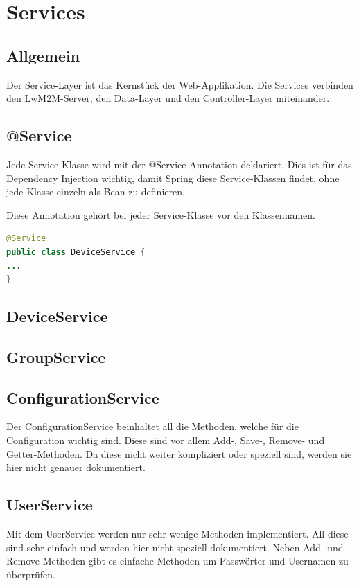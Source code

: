 \newpage

\section{Services}
\subsection{Allgemein}
Der Service-Layer ist das Kernstück der Web-Applikation. Die Services verbinden den LwM2M-Server, den Data-Layer und den Controller-Layer miteinander. 
\subsection{@Service}
Jede Service-Klasse wird mit der @Service Annotation deklariert. Dies ist für das Dependency Injection wichtig, damit Spring diese Service-Klassen findet, ohne jede Klasse einzeln als Bean zu definieren.

Diese Annotation gehört bei jeder Service-Klasse vor den Klassennamen.
\begin{lstlisting}[language=java]
@Service
public class DeviceService {
...
}
\end{lstlisting}

\subsection{DeviceService}

\subsection{GroupService}

\subsection{ConfigurationService}
Der ConfigurationService beinhaltet all die Methoden, welche für die Configuration wichtig sind. Diese sind vor allem Add-, Save-, Remove- und Getter-Methoden. Da diese nicht weiter kompliziert oder speziell sind, werden sie hier nicht genauer dokumentiert.
\subsection{UserService}
Mit dem UserService werden nur sehr wenige Methoden implementiert. All diese sind sehr einfach und werden hier nicht speziell dokumentiert. Neben Add- und Remove-Methoden gibt es einfache Methoden um Passwörter und Usernamen zu überprüfen.
